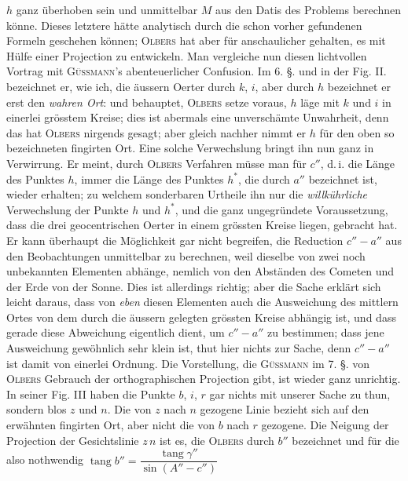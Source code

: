 $h$ ganz überhoben sein und unmittelbar $M$ aus den Datis des Problems berechnen könne. Dieses letztere hätte analytisch durch die schon vorher gefundenen Formeln geschehen können; \textsc{Olbers} hat aber für anschaulicher gehalten, es mit Hülfe einer Projection zu entwickeln. Man vergleiche nun diesen lichtvollen Vortrag mit \textsc{Güssmann}'s abenteuerlicher Confusion. Im 6. §. und in der Fig. II. bezeichnet er, wie ich, die äussern Oerter durch $k$, $i$, aber durch $h$ bezeichnet er erst den \emph{wahren Ort}: und behauptet, \textsc{Olbers} setze voraus, $h$ läge mit $k$ und $i$ in einerlei grösstem Kreise; dies ist abermals eine unverschämte Unwahrheit, denn das hat \textsc{Olbers} nirgends gesagt; aber gleich nachher nimmt er $h$ für den oben so bezeichneten fingirten Ort. Eine solche Verwechslung bringt ihn nun ganz in Verwirrung. Er meint, durch \textsc{Olbers} Verfahren müsse man für $c''$, d.\,i. die Länge des Punktes $h$, immer die Länge des Punktes $h^*$, die durch $a''$ bezeichnet ist, wieder erhalten; zu welchem sonderbaren Urtheile ihn nur die \emph{willkührliche} Verwechslung der Punkte $h$ und $h^*$, und die ganz ungegründete Voraussetzung, dass die drei geocentrischen Oerter in einem grössten Kreise liegen, gebracht hat. Er kann überhaupt die Möglichkeit gar nicht begreifen, die Reduction $c''-a''$ aus den Beobachtungen unmittelbar zu berechnen, weil dieselbe von zwei noch unbekannten Elementen abhänge, nemlich von den Abständen des Cometen und der Erde von der Sonne. Dies ist allerdings richtig; aber die Sache erklärt sich leicht daraus, dass von \emph{eben} diesen Elementen auch die Ausweichung des mittlern Ortes von dem durch die äussern gelegten grössten Kreise abhängig ist, und dass gerade diese Abweichung eigentlich dient, um $c''-a''$ zu bestimmen; dass jene Ausweichung gewöhnlich sehr klein ist, thut hier nichts zur Sache, denn $c''-a''$ ist damit von einerlei Ordnung. Die Vorstellung, die \textsc{Güssmann} im 7. §. von \textsc{Olbers} Gebrauch der orthographischen Projection gibt, ist wieder ganz unrichtig. In seiner Fig. III haben die Punkte $b$, $i$, $r$ gar nichts mit unserer Sache zu thun, sondern blos $z$ und $n$. Die von $z$ nach $n$ gezogene Linie bezieht sich auf den erwähnten fingirten Ort, aber nicht die von $b$ nach $r$ gezogene. Die Neigung der Projection der Gesichtslinie $z\,n$ ist es, die \textsc{Olbers} durch $b''$ bezeichnet und für die also nothwendig
$\operatorname{tang} b'' = \dfrac{\operatorname{tang} \gamma''}{\sin(A''-c'')}$
